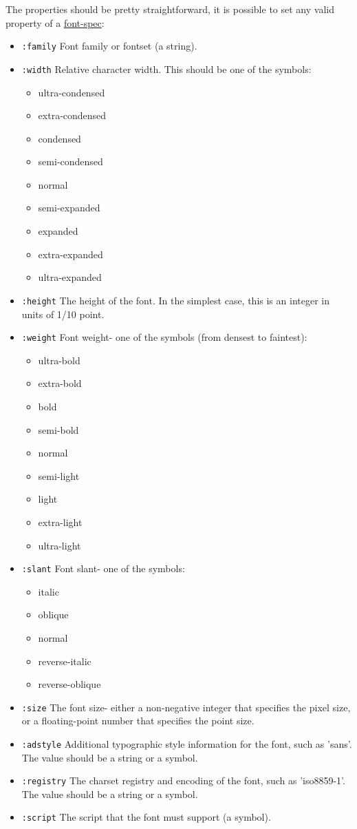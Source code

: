 \documentclass[11pt]{article}
\begin{document}
The properties should be pretty straightforward, it is possible to set any valid
property of a \href{http://www.gnu.org/software/emacs/manual/html\_node/elisp/Low\_002dLevel-Font.html}{font-spec}:
\begin{itemize}
\item \texttt{:family} Font family or fontset (a string).
\item \texttt{:width} Relative character width. This should be one of the symbols:
\begin{itemize}
\item ultra-condensed
\item extra-condensed
\item condensed
\item semi-condensed
\item normal
\item semi-expanded
\item expanded
\item extra-expanded
\item ultra-expanded
\end{itemize}
\item \texttt{:height} The height of the font. In the simplest case, this is an integer
in units of 1/10 point.
\item \texttt{:weight} Font weight- one of the symbols (from densest to faintest):
\begin{itemize}
\item ultra-bold
\item extra-bold
\item bold
\item semi-bold
\item normal
\item semi-light
\item light
\item extra-light
\item ultra-light
\end{itemize}
\item \texttt{:slant} Font slant- one of the symbols:
\begin{itemize}
\item italic
\item oblique
\item normal
\item reverse-italic
\item reverse-oblique
\end{itemize}
\item \texttt{:size} The font size- either a non-negative integer that specifies the
pixel size, or a floating-point number that specifies the point size.
\item \texttt{:adstyle} Additional typographic style information for the font, such as
'sans'. The value should be a string or a symbol.
\item \texttt{:registry} The charset registry and encoding of the font, such as
'iso8859-1'. The value should be a string or a symbol.
\item \texttt{:script} The script that the font must support (a symbol).
\end{itemize}
\end{document}
